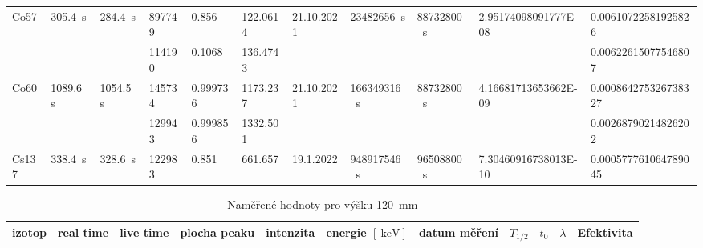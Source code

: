 \documentclass[12pt,a4paper]{article}
\begin{document}
\begin{spacing}{1.5}
\begin{landscape}
\begin{table}
\begin{tabular}{l|l|l|l|l|l|l|l|l|l|l}
		\multirow{2}{*}{Co57} & \multirow{2}{*}{\SI{305.4}{\second}}      & \multirow{2}{*}{\SI{284.4}{\second}}    & \num{897749}      & \num{0.856}     & \num{122.0614}     				  & \multirow{2}{*}{21.10.2021} & \multirow{2}{*}{\SI{23482656}{\second}}  & \multirow{2}{*}{\SI{88732800}{\second}} & \multirow{2}{*}{\num{2.95174098091777E-08}} & \num{0.00610722581925826}  \\  
		&                         			   							&                         				& \num{114190}       & \num{0.1068}    & \num{136.4743}     				  &                             &                            				&                           			  &                                       		& \num{0.00622615077546807}  \\ \hline
		\multirow{2}{*}{Co60} & \multirow{2}{*}{\SI{1089.6}{\second}}    & \multirow{2}{*}{\SI{1054.5}{\second}}   & \num{145734}       & \num{0.999736}  & \num{1173.237}     				  & \multirow{2}{*}{21.10.2021} & \multirow{2}{*}{\SI{166349316}{\second}} & \multirow{2}{*}{\SI{88732800}{\second}} & \multirow{2}{*}{\num{4.16681713653662E-09}} & \num{0.000864275326738327}  \\  
		&                          			   							&                          				& \num{129943}       & \num{0.999856}  & \num{1332.501}    					  &                             &                            				&                           			  &                                       		& \num{0.00268790214826202}  \\ \hline
		Cs137                 & \SI{338.4}{\second}                     & \SI{328.6}{\second}                     & \num{122983}       & \num{0.851}     & \num{661.657}      				  & 19.1.2022                   & \SI{948917546}{\second}                  & \SI{96508800}{\second}                  & \num{7.30460916738013E-10}                  & \num{0.000577761064789045}  \\ \hline
	\end{tabular}
\end{table}
\begin{table}
	\caption{Naměřené hodnoty pro výšku \SI{120}{\milli\meter}}
	\vspace*{2mm}
	\hspace*{-2cm}
	\begin{tabular}{l|l|l|l|l|l|l|l|l|l|l}
	\hline
		izotop                & real time                			 & live time                			& plocha peaku 	& intenzita	   & energie $ [\SI{}{\kilo\electronvolt}] $& datum měření              & $ T_{1/2}  $                 			    & $t_0$                        			  & $\lambda$                                		& Efektivita                \\ \hline

\end{tabular}
\end{table}
\end{landscape}
\end{spacing}
\end{document}
